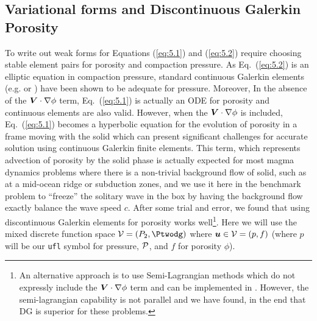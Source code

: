 \subsection{Variational forms and Discontinuous Galerkin Porosity}
\label{sec:variational-forms}

To write out weak forms for Equations (\ref{eq:5.1}) and
(\ref{eq:5.2}) require choosing stable element pairs for porosity and
compaction pressure.  As Eq.\ (\ref{eq:5.2}) is an elliptic equation
in compaction pressure, standard continuous Galerkin elements (e.g. \Pone
or \Ptwo) have been shown to be adequate for pressure.  Moreover, In the
absence of the ${\mbox{\boldmath$V$}}\cdot\nabla\phi$ term, Eq.\ (\ref{eq:5.1}) is
actually an ODE for porosity and continuous elements are also valid.
However, when the ${\mbox{\boldmath$V$}}\cdot\nabla\phi$ is included, Eq.\ (\ref{eq:5.1})
becomes a hyperbolic equation for the evolution of porosity in a frame
moving with the solid which can present significant challenges for
accurate solution using continuous Galerkin finite elements.  This term, which
represents advection of porosity by the solid phase is actually
expected for most magma dynamics problems where there is a non-trivial
background flow of solid, such as at a mid-ocean ridge or subduction
zones, and we use it here in the benchmark problem to ``freeze'' the
solitary wave in the box by having the background flow exactly balance
the wave speed $c$.  After some trial and error, we found that using
discontinuous Galerkin elements for porosity works well\footnote{An
  alternative approach is to use Semi-Lagrangian methods which do not
  expressly include the ${\mbox{\boldmath$V$}}\cdot\nabla\phi$ term and can be
  implemented in \TF{}.  However, the semi-lagrangian capability is
  not parallel and we have found, in the end that DG is superior for
  these problems.}.  Here we
will use the mixed discrete function space $\fspace=(\Ptwo,\Ptwodg)$
where ${\mbox{\boldmath$u$}}\in\mathcal{V}=(p,f)$ (where $p$ will be our  \texttt{ufl}
symbol for pressure, $\mathcal{P}$, and $f$ for porosity $\phi$).

